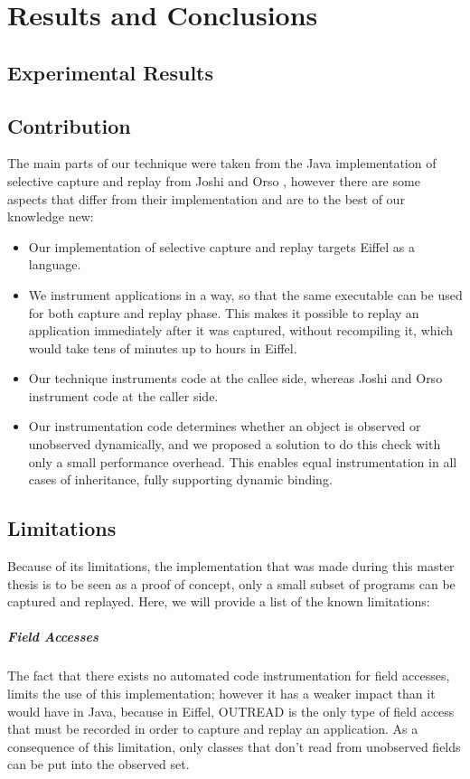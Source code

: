 \chapter{Results and Conclusions}


\section{Experimental Results}

\section{Contribution}
The main parts of our technique were taken from the Java implementation of selective capture and replay from Joshi and Orso \cite{orso05may}, however there are some aspects that differ from their implementation and are to the best of our knowledge new:

\begin{itemize}
\item Our implementation of selective capture and replay targets Eiffel as a language.
\item We instrument applications in a way, so that the same executable can be used for both capture and replay phase. This makes it possible to replay an application immediately after it was captured, without recompiling it, which would take tens of minutes up to hours in Eiffel.
\item Our technique instruments code at the callee side, whereas Joshi and Orso instrument code at the caller side. 
\item Our instrumentation code determines whether an object is observed or unobserved dynamically, and we proposed a solution to do this check with only a small performance overhead. This enables equal instrumentation in all cases of inheritance, fully supporting dynamic binding. 
\end {itemize}

\section {Limitations}
Because of its limitations, the implementation that was made during this master thesis is to be seen as a proof of concept, only a small subset of programs can be captured and replayed. Here, we will provide a list of the known limitations:

\paragraph{Field Accesses}
The fact that there exists no automated code instrumentation for field accesses, limits the use of this implementation; however it has a weaker impact than it would have in Java, because in Eiffel, OUTREAD is the only type of field access that must be recorded in order to capture and replay an application. As a consequence of this limitation, only classes that don't read from unobserved fields can be put into the observed set.

